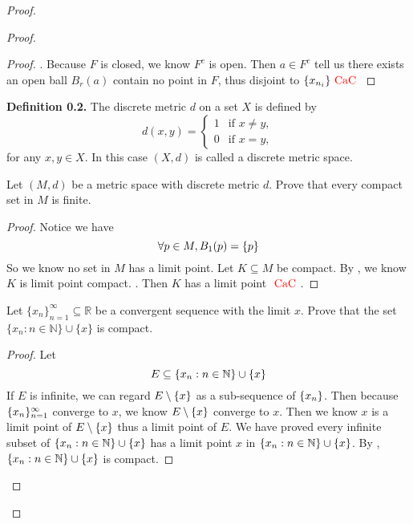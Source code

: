 \documentclass{report}
\begin{document}
\begin{proof}
\begin{proof}
\begin{proof}
. Because $F$ is closed, we know  $F^c$ is open. Then  $a\in F^c$ tell us there exists an open ball $B_r(a)$ contain no point in $F$, thus disjoint to  $\{ x_{n_i} \}\text{ \textcolor{red}{CaC} }$

\end{proof}
\textbf{Definition 0.2.} The discrete metric \( d \) on a set \( X \) is defined by
\[
d(x,y) = 
\begin{cases} 
1 & \text{if } x \neq y, \\
0 & \text{if } x = y,
\end{cases}
\]
for any \( x, y \in X \). In this case \( (X,d) \) is called a discrete metric space.
\begin{question}{}{}

Let \( (M, d) \) be a metric space with discrete metric \( d \). Prove that every compact set in \( M \) is finite.
\end{question}
\begin{proof}
Notice we have
\begin{equation}
\forall p\in M, B_1(p)=\{ p \}
\end{equation}
So we know no set in $M$ has a limit point. Let $K\subseteq M$ be compact. By , we know $K$ is limit point compact. . Then $K$ has a limit point  $\text{ \textcolor{red}{CaC} }$.
\end{proof}
\begin{question}{}{}

Let \( \{ x_n \}_{n=1}^{\infty} \subseteq \mathbb{R} \) be a convergent sequence with the limit \( x \). Prove that the set \( \{ x_n : n \in \mathbb{N} \} \cup \{ x \} \) is compact.
\end{question}
\begin{proof}
Let 
\begin{equation}
E\subseteq \{ x_n:n\in\mathbb{N} \}\cup \{ x \}
\end{equation}
If $E$ is infinite, we can regard  $E\setminus \{ x \}$ as a sub-sequence of $\{ x_n \}$. Then because $\{ x_n \}_{n=1}^\infty$ converge to $x$, we know  $E\setminus \{ x \}$ converge to $x$. Then we know $x$ is a limit point of $E\setminus \{ x \}$ thus a limit point of $E$. We have proved every infinite subset of $\{ x_n:n\in\mathbb{N} \}\cup \{ x \}$ has a limit point $x$ in $\{ x_n:n\in\mathbb{N} \}\cup \{ x \}$. By , $\{ x_n:n\in\mathbb{N} \}\cup \{ x \}$ is compact.
\end{proof}
\begin{question}{}{}


\end{question}
\end{proof}
\end{proof}
\end{document}
